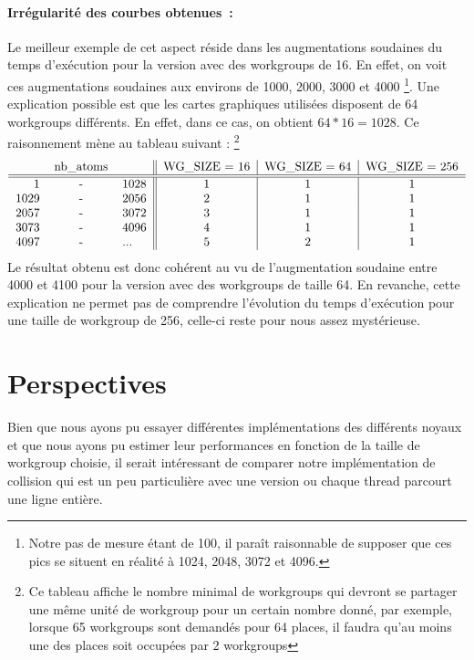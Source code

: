 \documentclass{article}
\begin{document}
\paragraph{Irrégularité des courbes obtenues~:}
Le meilleur exemple de cet aspect réside dans les augmentations soudaines du
temps d'exécution pour la version avec des workgroups de 16. En effet, on
voit ces augmentations soudaines aux environs de 1000, 2000, 3000 et 4000
\footnote{Notre pas de mesure étant de 100, il paraît raisonnable de supposer
que ces pics se situent en réalité à 1024, 2048, 3072 et 4096.}. Une explication
possible est que les cartes graphiques utilisées disposent de 64 workgroups
différents. En effet, dans ce cas, on obtient $64 * 16 = 1028$. Ce raisonnement
mène au tableau suivant :
\footnote{Ce tableau affiche le nombre minimal de workgroups qui devront se
partager une même unité de workgroup pour un certain nombre donné, par exemple,
lorsque 65 workgroups sont demandés pour 64 places, il faudra qu'au moins une
des places soit occupées par 2 workgroups}
$$
  \begin{tabular}{rcl||c|c|c}
    &nb\_atoms&  & WG\_SIZE = 16 & WG\_SIZE = 64 & WG\_SIZE = 256\\
    \hline \hline
       1&-&1028  &       1       &       1       &       1       \\
    1029&-&2056  &       2       &       1       &       1       \\
    2057&-&3072  &       3       &       1       &       1       \\
    3073&-&4096  &       4       &       1       &       1       \\
    4097&-&...   &       5       &       2       &       1
  \end{tabular}
$$
Le résultat obtenu est donc cohérent au vu de l'augmentation soudaine entre
4000 et 4100 pour la version avec des workgroups de taille 64. En revanche,
cette explication ne permet pas de comprendre l'évolution du temps d'exécution
pour une taille de workgroup de 256, celle-ci reste pour nous assez mystérieuse.

\section{Perspectives}
Bien que nous ayons pu essayer différentes implémentations des différents
noyaux et que nous ayons pu estimer leur performances en fonction de la
taille de workgroup choisie, il serait intéressant de comparer notre
implémentation de collision qui est un peu particulière avec une version ou
chaque thread parcourt une ligne entière.
\end{document}
